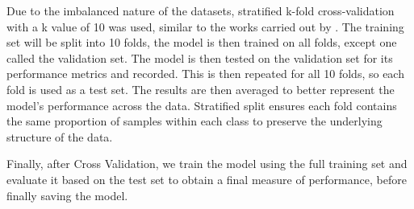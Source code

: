 Due to the imbalanced nature of the datasets, stratified k-fold cross-validation with a k value of 10 was used, similar to the works carried out by \textcite{s22155633}. The training set will be split into 10 folds, the model is then trained on all folds, except one called the validation set. The model is then tested on the validation set for its performance metrics and recorded. This is then repeated for all 10 folds, so each fold is used as a test set. The results are then averaged to better represent the model's performance across the data. Stratified split ensures each fold contains the same proportion of samples within each class to preserve the underlying structure of the data. 

Finally, after Cross Validation, we train the model using the full training set and evaluate it based on the test set to obtain a final measure of performance, before finally saving the model.